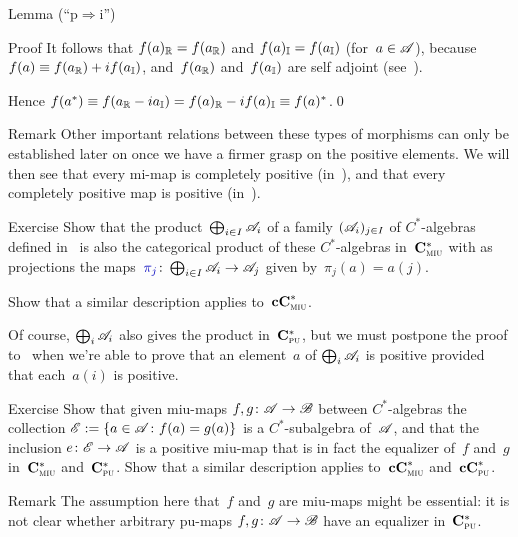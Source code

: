 \documentclass[a]{subfiles}
\begin{document}
\begin{parsec}
\begin{point}{Lemma (``p$\Rightarrow$i'')}
\begin{point}{Proof}
It follows that $f(a)_{\mathbb{R}}=f(a_{\mathbb{R}})$
and $f(a)_{\mathbb{I}}=f(a_{\mathbb{I}})$ (for~$a\in\mathscr{A}$),
because $f(a)\equiv f(a_{\mathbb{R}})+if(a_{\mathbb{I}})$,
and~$f(a_{\mathbb{R}})$ and~$f(a_{\mathbb{I}})$
are self adjoint
(see~).

Hence $f(a^*)\equiv f(a_{\mathbb{R}}-ia_{\mathbb{I}})
=f(a)_{\mathbb{R}}-if(a)_{\mathbb{I}}\equiv f(a)^*$.\qed
\end{point}
\end{point}
\begin{point}{Remark}%
Other important relations between these types of morphisms
can only be established later on
once we have a firmer grasp on the positive elements.
We will then see  
that every mi-map 
is completely positive (in~),
and that every completely positive map is positive 
(in~).
\end{point}
\begin{point}{Exercise}%
Show that
the product~$\bigoplus_{i\in I}\mathscr{A}_i$
of
a family $(\mathscr{A}_i)_{j\in I}$
of $C^*$-algebras
defined in~
is also the categorical product 
of these $C^*$-algebras
in~$\mathbf{C}^*_{\text{\textsc{miu}}}$
with as projections
the maps~$\Define{\pi_j}\colon \bigoplus_{i \in I}\scrA_i\to\scrA_j$
given by~$\pi_j(a)=a(j)$.

Show that a similar description applies to~$\mathbf{cC}^*_{\text{\textsc{miu}}}$.

Of course,
$\bigoplus_i\mathscr{A}_i$
also gives the product in~$\mathbf{C}^*_{\text{\textsc{pu}}}$,
but we must postpone the proof
to~
when we're able to prove
that an element~$a$ of $\bigoplus_i \mathscr{A}_i$
is positive provided that each~$a(i)$ is positive.
\end{point}
\begin{point}{Exercise}%
Show that given miu-maps $f,g\colon \mathscr{A}\to\mathscr{B}$
between $C^*$-algebras
the collection $\mathscr{E}:=\{a\in\mathscr{A}\colon f(a)=g(a)\}$
is a $C^*$-subalgebra
of~$\mathscr{A}$,
and that the inclusion $e\colon \mathscr{E}\to\mathscr{A}$
is a positive miu-map
that is in fact the equalizer of~$f$ and~$g$
in~$\mathbf{C}^*_{\text{\textsc{miu}}}$ and~$\mathbf{C}^*_{\text{\textsc{pu}}}$.
Show that a similar description applies
to~$\mathbf{cC}^*_{\text{\textsc{miu}}}$ and~$\mathbf{cC}^*_{\text{\textsc{pu}}}$.
\begin{point}{Remark}%
The assumption here that~$f$ and~$g$ are miu-maps
might be essential:
it is not clear whether arbitrary pu-maps $f,g\colon \mathscr{A}\to\mathscr{B}$
have an equalizer in~$\mathbf{C}^*_{\text{\textsc{pu}}}$.
\end{point}
\end{point}
\end{parsec}
\end{document}
